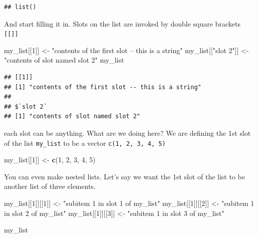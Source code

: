\documentclass[]{book}
\newenvironment{Shaded}{\begin{snugshade}}{\end{snugshade}}
\newcommand{\KeywordTok}[1]{\textcolor[rgb]{0.13,0.29,0.53}{\textbf{#1}}}
\newcommand{\DecValTok}[1]{\textcolor[rgb]{0.00,0.00,0.81}{#1}}
\newcommand{\StringTok}[1]{\textcolor[rgb]{0.31,0.60,0.02}{#1}}
\newcommand{\NormalTok}[1]{#1}
\theoremstyle{definition}
\theoremstyle{definition}
\theoremstyle{definition}
\theoremstyle{remark}
\begin{document}
\begin{verbatim}
## list()
\end{verbatim}

And start filling it in. Slots on the list are invoked by double square
brackets \texttt{{[}{[}{]}{]}}

\begin{Shaded}
\begin{Highlighting}[]
\NormalTok{my_list[[}\DecValTok{1}\NormalTok{]] <-}\StringTok{ "contents of the first slot -- this is a string"}
\NormalTok{my_list[[}\StringTok{"slot 2"}\NormalTok{]] <-}\StringTok{ "contents of slot named slot 2"}
\NormalTok{my_list}
\end{Highlighting}
\end{Shaded}

\begin{verbatim}
## [[1]]
## [1] "contents of the first slot -- this is a string"
## 
## $`slot 2`
## [1] "contents of slot named slot 2"
\end{verbatim}

each slot can be anything. What are we doing here? We are defining the
1st slot of the list \texttt{my\_list} to be a vector
\texttt{c(1,\ 2,\ 3,\ 4,\ 5)}

\begin{Shaded}
\begin{Highlighting}[]
\NormalTok{my_list[[}\DecValTok{1}\NormalTok{]] <-}\StringTok{ }\KeywordTok{c}\NormalTok{(}\DecValTok{1}\NormalTok{, }\DecValTok{2}\NormalTok{, }\DecValTok{3}\NormalTok{, }\DecValTok{4}\NormalTok{, }\DecValTok{5}\NormalTok{)}
\end{Highlighting}
\end{Shaded}

You can even make nested lists. Let's say we want the 1st slot of the
list to be another list of three elements.

\begin{Shaded}
\begin{Highlighting}[]
\NormalTok{my_list[[}\DecValTok{1}\NormalTok{]][[}\DecValTok{1}\NormalTok{]] <-}\StringTok{ "subitem 1 in slot 1 of my_list"}
\NormalTok{my_list[[}\DecValTok{1}\NormalTok{]][[}\DecValTok{2}\NormalTok{]] <-}\StringTok{ "subitem 1 in slot 2 of my_list"}
\NormalTok{my_list[[}\DecValTok{1}\NormalTok{]][[}\DecValTok{3}\NormalTok{]] <-}\StringTok{ "subitem 1 in slot 3 of my_list"}

\NormalTok{my_list}
\end{Highlighting}
\end{Shaded}
\end{document}
